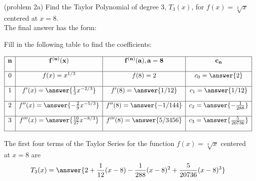 \documentclass[handout]{ximera}
\begin{document}
\begin{problem}(problem 2a) Find the Taylor Polynomial of degree 3, $T_3(x)$, for $f(x) = \sqrt[3] x$ centered at $x = 8$.\\

The final answer has the form:
\begin{center}
\begin{multipleChoice}
\end{multipleChoice}
\end{center}

Fill in the following table to find the coefficients:

\[
\begin{array}{|c|c|c|c|} 
\hline
\bf{n} & \bf{f^{(n)}(x)} & \bf{f^{(n)}(a), a = 8} & \bf{c_n} \\[1em] 
\hline
 0 & f(x) = x^{1/3} & f(8) = 2 & c_0 = \answer{2} \\[1em]
\hline
1 & f'(x) = \answer{\frac13 x^{-2/3}} & f'(8) = \answer{1/12} & c_1 = \answer{1/12} \\[1em]
\hline
 2 & f''(x) =\answer{-\frac29 x^{-5/3}} & f''(8) = \answer{-1/144} & c_2 = \answer{-\frac{1}{288}} \\[1em]
\hline
 3 & f'''(x) =\answer{\frac{10}{27} x^{-8/3}} & f'''(8) = \answer{5/3456 } & c_3 = \answer{\frac{5}{20736}}\\[1em]
\hline
\end{array}
\]


The first four terms of the Taylor Series for the function $f(x) = \sqrt[3] x$ centered at $x = 8$ are
\[
T_3(x) = \answer{2 + \frac{1}{12}(x-8) -\frac{1}{288}(x-8)^2 + \frac{5}{20736}(x-8)^3}
\]


\end{problem}
\end{document}
